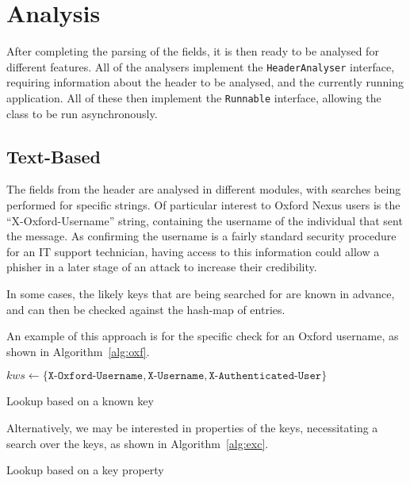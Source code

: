 \section{Analysis}

After completing the parsing of the fields, it is then ready to be analysed for
different features.  All of the analysers implement the \texttt{HeaderAnalyser}
interface, requiring information about the header to be analysed, and the
currently running application.  All of these then implement the
\texttt{Runnable} interface, allowing the class to be run asynchronously.

\subsection{Text-Based}

The fields from the header are analysed in different modules, with searches
being performed for specific strings.  Of particular interest to Oxford Nexus
users is the ``X-Oxford-Username'' string, containing the username of the
individual that sent the message.  As confirming the username is a fairly
standard security procedure for an IT support technician, having access to this
information could allow a phisher in a later stage of an attack to increase
their credibility.

In some cases, the likely keys that are being searched for are known in advance,
and can then be checked against the hash-map of entries.

An example of this approach is for the specific check for an Oxford username, as shown in Algorithm~\ref{alg:oxf}.

\begin{algorithm}
$kws \gets \{\texttt{X-Oxford-Username}, \texttt{X-Username}, \texttt{X-Authenticated-User}\}$\;
	\caption{Lookup based on a known key}
	\label{alg:oxf}
\end{algorithm}

Alternatively, we may be interested in properties of the keys, necessitating a search over the keys, as shown in Algorithm~\ref{alg:exc}.

\begin{algorithm}
	\caption{Lookup based on a key property}
	\label{alg:exc}
\end{algorithm}

